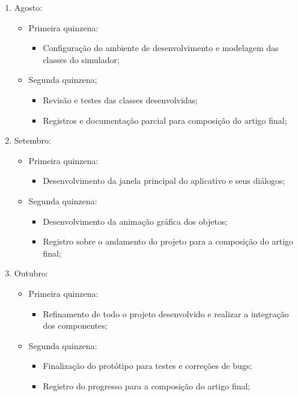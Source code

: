 \begin{enumerate}
\item Agosto:
  \begin{itemize}
    \item Primeira quinzena:
    \begin{itemize}
      \item Configuração do ambiente de desenvolvimento e modelagem das classes do simulador;
    \end{itemize}
    \item Segunda quinzena;
      \begin{itemize}
        \item Revisão e testes das classes desenvolvidas;
        \item Registros e documentação parcial para composição do artigo final;
      \end{itemize}
    \end{itemize}

\item Setembro:
  \begin{itemize}
    \item Primeira quinzena:
      \begin{itemize}
        \item Desenvolvimento da janela principal do aplicativo e seus diálogos;
      \end{itemize}
    \item Segunda quinzena:
      \begin{itemize}
        \item Desenvolvimento da animação gráfica dos objetos;
        \item Registro sobre o andamento do projeto para a composição do artigo final;
      \end{itemize}
  \end{itemize}

\item Outubro:
  \begin{itemize}
    \item Primeira quinzena:
      \begin{itemize}
        \item Refinamento de todo o projeto desenvolvido e realizar a integração dos componentes;
      \end{itemize}
    \item Segunda quinzena:
      \begin{itemize}
        \item Finalização do protótipo para testes e correções de bugs;
        \item Registro do progresso para a composição do artigo final;
      \end{itemize}
  \end{itemize}


\end{enumerate}
